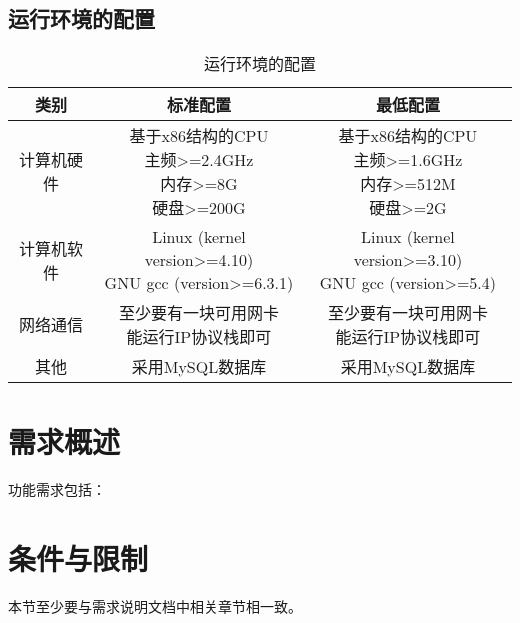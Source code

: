 \subsection{运行环境的配置}
\begin{table}[htbp]
\centering
\caption{运行环境的配置} \label{tab:operation-environment}
\begin{tabular}{|c|c|c|}
    \hline
    类别 & 标准配置 & 最低配置 \\
    \hline
    计算机硬件 & \tabincell{c}{基于x86结构的CPU\\ 主频>=2.4GHz\\ 内存>=8G\\ 硬盘>=200G} & \tabincell{c}{基于x86结构的CPU\\ 主频>=1.6GHz\\ 内存>=512M\\ 硬盘>=2G} \\
    \hline
    计算机软件 & \tabincell{c}{Linux (kernel version>=4.10)\\ GNU gcc (version>=6.3.1)} & \tabincell{c}{Linux (kernel version>=3.10)\\ GNU gcc (version>=5.4)} \\
    \hline
    网络通信 & \tabincell{c}{至少要有一块可用网卡\\ 能运行IP协议栈即可} & \tabincell{c}{至少要有一块可用网卡\\ 能运行IP协议栈即可} \\
    \hline
    其他 & 采用MySQL数据库 & 采用MySQL数据库 \\
    \hline

\end{tabular}
\end{table}

\section{需求概述}
功能需求包括：


\section{条件与限制}
本节至少要与需求说明文档中相关章节相一致。
